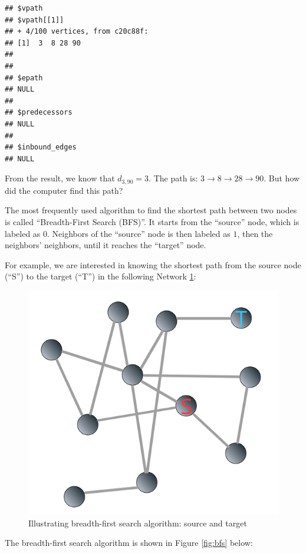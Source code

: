 \documentclass[
]{krantz}
\begin{document}
\begin{verbatim}
## $vpath
## $vpath[[1]]
## + 4/100 vertices, from c20c88f:
## [1]  3  8 28 90
## 
## 
## $epath
## NULL
## 
## $predecessors
## NULL
## 
## $inbound_edges
## NULL
\end{verbatim}

From the result, we know that \(d_{3, 90} = 3\). The path is: \(3 \to 8 \to 28 \to 90\). But how did the computer find this path?

The most frequently used algorithm to find the shortest path between two nodes is called ``Breadth-First Search (BFS)''. It starts from the ``source'' node, which is labeled as \(0\). Neighbors of the ``source'' node is then labeled as \(1\), then the neighbors' neighbors, until it reaches the ``target'' node.

For example, we are interested in knowing the shortest path from the source node (``S'') to the target (``T'') in the following Network \ref{fig:bfs01}:

\begin{figure}

{\centering \includegraphics[width=0.55\linewidth]{images/bfs01} 

}

\caption{Illustrating breadth-first search algorithm: source and target}\label{fig:bfs01}
\end{figure}

The breadth-first search algorithm is shown in Figure \ref{fig:bfs} below:
\end{document}

